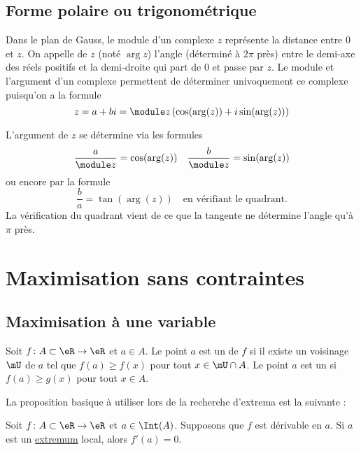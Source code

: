 \subsection{Forme polaire ou trigonométrique}
 Dans le plan de Gauss, le module d'un complexe $z$ représente la
 distance entre $0$ et $z$. On appelle  de $z$ (noté
 $\arg z$) l'angle (déterminé à $2\pi$ près) entre le demi-axe des
 réels positifs et la demi-droite qui part de $0$ et passe par $z$. Le
 module et l'argument d'un complexe permettent de déterminer
 univoquement ce complexe puisqu'on a la formule
 \[z = a + bi = \module z \left( \cos(\arg(z)) + i \sin(\arg(z))
 \right)\]

 L'argument de $z$ se détermine via les formules
 \[\frac a {\module z} = \cos(\arg(z)) \quad \frac b {\module z} =
 \sin(\arg(z))\] ou encore par la formule
 \[\frac b a = \tan(\arg(z)) \quad \text{en vérifiant le
   quadrant.}\]%
 La vérification du quadrant vient de ce que la tangente ne détermine
 l'angle qu'à $\pi$ près.

                    \section{Maximisation sans contraintes}

                    \subsection{Maximisation à une variable}

\begin{definition}
Soit $f\colon A\subset \eR\to \eR$ et $a\in A$. Le point $a$ est un  de $f$ si il existe un voisinage $\mU$ de $a$ tel que $f(a)\geq f(x)$ pour tout $x\in\mU\cap A$. Le point $a$ est un  si $f(a)\geq g(x)$ pour tout $x\in A$.
\end{definition}

La proposition basique à utiliser lors de la recherche d'extrema est la suivante :
\begin{proposition}
Soit $f\colon A\subset\eR\to \eR$ et $a\in\Int(A)$. Supposons que $f$ est dérivable en $a$. Si $a$ est un \href{http://fr.wikipedia.org/wiki/Extremum}{extremum} local, alors $f'(a)=0$.
\end{proposition}

